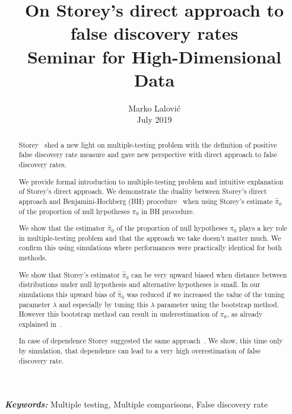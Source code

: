 \documentclass[10pt]{article}
\providecommand{\keywords}[1]{\textbf{\textit{Keywords:}} #1}
\begin{document}
\title{On Storey's direct approach to false discovery rates\\
{\large Seminar for High-Dimensional Data}}
\author{Marko Lalović
\\
July 2019 \\
}

\maketitle

\begin{abstract}
Storey~\cite{Storey} shed a new light on multiple-testing problem with the definition of positive false discovery rate measure and gave new perspective with direct approach to false discovery rates.

We provide formal introduction to multiple-testing problem and intuitive explanation of Storey's direct approach. We demonstrate the duality between Storey's direct approach and Benjamini-Hochberg (BH) procedure~\cite{BH} when using Storey's estimate $\widehat{\pi}_{0}$ of the proportion of null hypotheses $\pi_{0}$ in BH procedure. 

We show that the estimator $\widehat{\pi}_{0}$ of the proportion of null hypotheses $\pi_{0}$ plays a key role in multiple-testing problem and that the approach we take doesn't matter much. We confirm this using simulations where performances were practically identical for both methods.

We show that Storey's estimator $\widehat{\pi}_{0}$ can be very upward biased when distance between distributions under null hypothesis and alternative hypotheses is small. In our simulations this upward bias of $\widehat{\pi}_{0}$ was reduced if we increased the value of the tuning parameter $\lambda$ and especially by tuning this $\lambda$ parameter using the bootstrap method. However this bootstrap method can result in underestimation of $\pi_{0}$, as already explained in~\cite{Black}. 

In case of dependence Storey suggested the same approach~\cite{Dependence}. We show, this time only by simulation, that dependence can lead to a very high overestimation of false discovery rate.
\end{abstract}

\keywords{Multiple testing, Multiple comparisons, False discovery rate}

\tableofcontents

\end{document}
